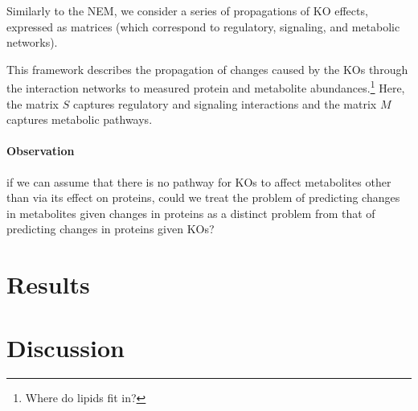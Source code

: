 \documentclass{article}
\begin{document}
Similarly to the NEM, we consider a series of propagations of KO effects, expressed as matrices (which correspond to regulatory, signaling, and metabolic networks).


This framework describes the propagation of changes caused by the KOs through the interaction networks to measured protein and metabolite abundances.\footnote{Where do lipids fit in?}
Here, the matrix $S$ captures regulatory and signaling interactions and the matrix $M$ captures metabolic pathways.

\paragraph{Observation} if we can assume that there is no pathway for KOs to affect metabolites other than via its effect on proteins, could we treat the problem of predicting changes in metabolites given changes in proteins as a distinct problem from that of predicting changes in proteins given KOs?

\section{Results}

\section{Discussion}

\printbibliography
\end{document}

